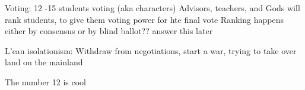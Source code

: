 \documentclass[blue]{GL2020}
\begin{document}
\name{\bGMSheet{}}

Voting:
12 -15 students voting (aka characters)
Advisors, teachers, and Gods will rank students, to give them voting power for hte final vote
Ranking happens either by consensus or by blind ballot?? answer this later


L'eau isolationism:
Withdraw from negotiations, start a war, trying to take over land on the mainland

The number 12 is cool
\end{document}
